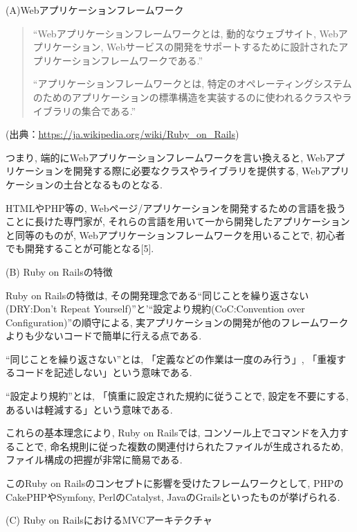 \begin{description}
\item (A)Webアプリケーションフレームワーク

\begin{quotation}
“Webアプリケーションフレームワークとは, 動的なウェブサイト, Webアプリケーション, Webサービスの開発をサポートするために設計されたアプリケーションフレームワークである.”

“アプリケーションフレームワークとは, 特定のオペレーティングシステムのためのアプリケーションの標準構造を実装するのに使われるクラスやライブラリの集合である.”
\end{quotation}
\begin{flushright}
(出典：\url{https://ja.wikipedia.org/wiki/Ruby_on_Rails})
\end{flushright}

つまり, 端的にWebアプリケーションフレームワークを言い換えると, Webアプリケーションを開発する際に必要なクラスやライブラリを提供する, Webアプリケーションの土台となるものとなる.

HTMLやPHP等の, Webページ/アプリケーションを開発するための言語を扱うことに長けた専門家が, それらの言語を用いて一から開発したアプリケーションと同等のものが, Webアプリケーションフレームワークを用いることで, 初心者でも開発することが可能となる[5].

\item (B) Ruby on Railsの特徴

Ruby on Railsの特徴は, その開発理念である“同じことを繰り返さない(DRY:Don't Repeat Yourself)”と'“設定より規約(CoC:Convention over Configuration)”の順守による, 実アプリケーションの開発が他のフレームワークよりも少ないコードで簡単に行える点である.

“同じことを繰り返さない”とは, 「定義などの作業は一度のみ行う」, 「重複するコードを記述しない」という意味である.

“設定より規約”とは, 「慎重に設定された規約に従うことで, 設定を不要にする, あるいは軽減する」という意味である.

これらの基本理念により, Ruby on Railsでは, コンソール上でコマンドを入力することで, 命名規則に従った複数の関連付けられたファイルが生成されるため, ファイル構成の把握が非常に簡易である.

このRuby on Railsのコンセプトに影響を受けたフレームワークとして, PHPのCakePHPやSymfony, PerlのCatalyst, JavaのGrailsといったものが挙げられる.

\item (C) Ruby on RailsにおけるMVCアーキテクチャ


\end{description}
